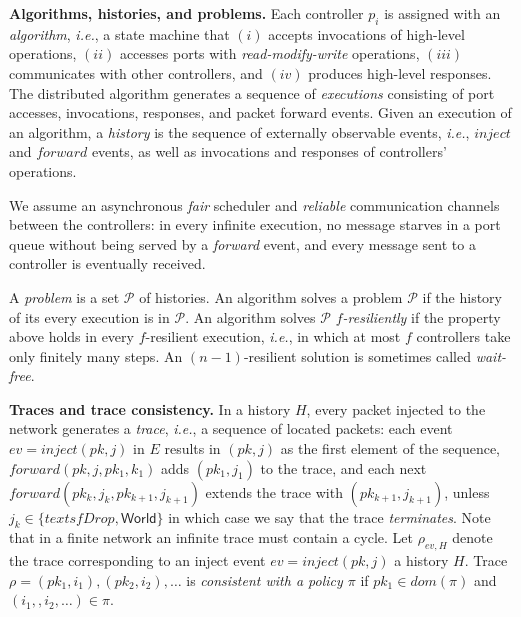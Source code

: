 \documentclass[11pt,pdftex,letter]{article}
\newcommand{\dom}{\textit{dom}}
\newcommand{\ie}{{\it i.e.}}
\newcommand{\mcnote}[1]{\textcolor{heraldBlue}{\small \bf [MC: #1]}}
\newcommand{\mcnote}[1]{}
\begin{document}
\noindent\textbf{Algorithms, histories,  and problems.}
%
Each controller $p_i$ is assigned with an \emph{algorithm}, \ie, a state machine that
$(i)$ accepts invocations of high-level operations, $(ii)$ accesses ports with
\textit{read-modify-write} operations,
$(iii)$ communicates with other controllers, and $(iv)$ produces high-level responses.
The distributed algorithm generates a sequence of \emph{executions}
consisting of port accesses, invocations, responses, and packet forward events.
Given an execution of an algorithm, a \emph{history} is the sequence of externally observable events, \ie, $\textit{inject}$
and $\textit{forward}$ events, as well as
invocations and responses of controllers' operations.

We assume an asynchronous \emph{fair} scheduler and \emph{reliable} communication channels
between the controllers: in every infinite execution, no message starves in a port queue without being
served by a \emph{forward} event, and
every message sent to a controller is eventually received.

A \emph{problem} is a set $\mathcal P$ of histories.
An algorithm solves a problem $\mathcal P$ if the history of its every
execution is in $\mathcal P$.
An algorithm solves $\mathcal P$ \emph{$f$-resiliently} if the property above holds in
every $f$-resilient execution, \ie, in which at most $f$ controllers
take only finitely many steps.
An $(n-1)$-resilient solution is sometimes called \emph{wait-free}.


\vspace{1mm}\noindent\textbf{Traces and trace consistency.}
In a history $H$, every packet injected to the network
generates a \emph{trace}, \ie, a sequence of located packets: each event
$ev=\textit{inject}(pk,j)$ in $E$ results in $(pk,j)$ as the first element of
the sequence, $\textit{forward}(pk,j,pk_1,k_1)$ 
adds $(pk_1,j_1)$ to the trace, 
and each next $\textit{forward}(pk_k,j_k,pk_{k+1},j_{k+1})$ extends
the trace with $(pk_{k+1},j_{k+1})$, unless
$j_k\in\{textsf{Drop},\textsf{World}\}$ in which case we say that the
trace \emph{terminates}.
Note that in a finite network an infinite trace must contain a cycle.
%
Let $\rho_{ev,H}$
denote the trace corresponding
to an inject event $ev=\textit{inject}(pk,j)$ a history $H$.  %
%
Trace $\rho=(pk_1,i_1),(pk_2,i_2),\ldots$ is
\emph{consistent with a policy $\pi$} if
$pk_1\in \dom(\pi)$ and $(i_1,,i_2,\ldots) \in \pi$.
\end{document}
